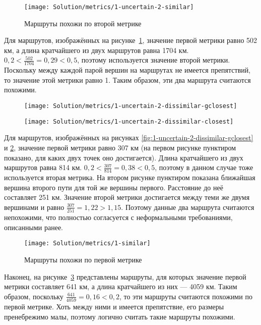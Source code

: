 \begin{figure}
    \texttt{[image: Solution/metrics/1-uncertain-2-similar]}
    \caption{Маршруты похожи по второй метрике}
    \label{fig:1-uncertain-2-similar}
\end{figure}

Для маршрутов, изображённых на
рисунке~\ref{fig:1-uncertain-2-similar}, значение первой метрики равно
502 км, а длина кратчайшего из двух маршрутов равна 1704 км. $0,2 <
\frac{502}{1704} = 0,29 < 0,5$, поэтому используется значение второй метрики.
Поскольку между каждой парой вершин на маршрутах не имеется
препятствий, то значение этой метрики равно 1. Таким образом, эти два
маршрута считаются похожими.

\begin{figure}
    \centering
    \begin{minipage}{.5\textwidth}
        \centering
        \texttt{[image: Solution/metrics/1-uncertain-2-dissimilar-gclosest]}
        \label{fig:1-uncertain-2-dissimilar-gclosest}
    \end{minipage}%
    \begin{minipage}{.5\textwidth}
        \centering
        \texttt{[image: Solution/metrics/1-uncertain-2-dissimilar-closest]}
        \label{fig:1-uncertain-2-dissimilar-closest}
    \end{minipage}
\end{figure}

Для маршрутов, изображённых на рисунках
\ref{fig:1-uncertain-2-dissimilar-gclosest} и
\ref{fig:1-uncertain-2-dissimilar-closest}, значение первой метрики
равно 307 км (на первом рисунке пунктиром показано, для каких двух
точек оно достигается). Длина кратчайшего из двух маршрутов равна 814
км. $0,2 < \frac{307}{814} = 0,38 < 0,5$, поэтому в данном случае тоже
используется вторая метрика. На втором рисунке пунктиром показана
ближайшая вершина второго пути для той же вершины первого. Расстояние
до неё составляет 251 км. Значение второй метрики достигается между
теми же двумя вершинами и равно $\frac{307}{251} = 1,22 > 1,15$.
Поэтому данные два маршрута считаются непохожими, что полностью
согласуется с неформальными требованиями, описанными ранее.

\begin{figure}
    \texttt{[image: Solution/metrics/1-similar]}
    \caption{Маршруты похожи по первой метрике}
    \label{fig:1-similar}
\end{figure}

Наконец, на рисунке~\ref{fig:1-similar} представлены маршруты, для
которых значение первой метрики составляет 641 км, а длина кратчайшего
из них --- 4059 км. Таким образом, поскольку
$\frac{641}{4059} = 0,16 < 0,2$, то эти маршруты считаются похожими по
первой метрике. Хоть между ними и имеется препятствие, его размеры
пренебрежимо малы, поэтому логично считать такие маршруты похожими.

\FloatBarrier

